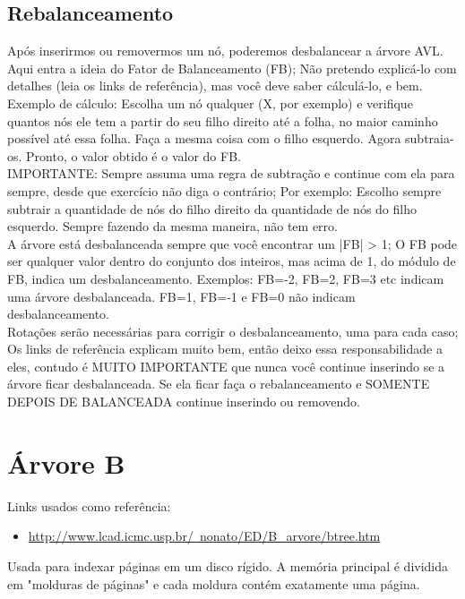 \documentclass{article}
\begin{document}
\subsection{Rebalanceamento}
Após inserirmos ou removermos um nó, poderemos desbalancear a árvore AVL. Aqui
entra a ideia do Fator de Balanceamento (FB); Não pretendo explicá-lo com
detalhes (leia os links de referência), mas você deve saber cálculá-lo, e bem.\\
Exemplo de cálculo: Escolha um nó qualquer (X, por exemplo) e verifique quantos
nós ele tem a partir do seu filho direito até a folha, no maior caminho possível
até essa folha. Faça a mesma coisa com o filho esquerdo. Agora subtraia-os.
Pronto, o valor obtido é o valor do FB.\\
IMPORTANTE: Sempre assuma uma regra de subtração e continue com ela para sempre,
desde que exercício não diga o contrário; Por exemplo: Escolho sempre
subtrair a quantidade de nós do filho direito da quantidade de nós do filho esquerdo.
Sempre fazendo da mesma maneira, não tem erro.\\
A árvore está desbalanceada sempre que você encontrar um |FB| > 1; O FB pode ser
qualquer valor dentro do conjunto dos inteiros, mas acima de 1, do módulo de FB,
indica um desbalanceamento. Exemplos: FB=-2, FB=2, FB=3 etc indicam uma árvore
desbalanceada. FB=1, FB=-1 e FB=0 não indicam desbalanceamento.\\
Rotações serão necessárias para corrigir o desbalanceamento, uma para cada caso;
Os links de referência explicam muito bem, então deixo essa responsabilidade a
eles, contudo é MUITO IMPORTANTE que nunca você continue inserindo se a árvore
ficar desbalanceada. Se ela ficar faça o rebalanceamento e SOMENTE DEPOIS DE BALANCEADA continue inserindo ou removendo.

\section{Árvore B}

Links usados como referência:

\begin{itemize}
   \item \href{http://www.lcad.icmc.usp.br/~nonato/ED/B\_arvore/btree.htm}{http://www.lcad.icmc.usp.br/~nonato/ED/B\_arvore/btree.htm}
\end{itemize}

Usada para indexar páginas em um disco rígido. A memória principal é dividida em "molduras de
páginas" e cada moldura contém exatamente uma página.\\
\end{document}
